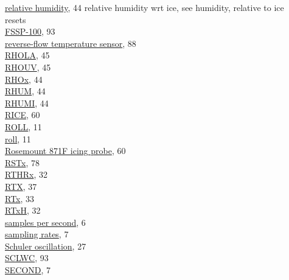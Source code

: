 \documentclass[
]{book}
\begin{document}
\href{./4-the-state-of-the-atmosphere.html\#rhumw}{relative humidity}, 44
relative humidity wrt ice, see humidity, relative to ice\\
resets\\
\hspace*{0.333em}\hspace*{0.333em}\href{./10-obsolete-variables.html\#freset}{FSSP-100}, 93\\
\href{./10-obsolete-variables.html\#ttrf}{reverse-flow temperature sensor}, 88\\
\href{./4-the-state-of-the-atmosphere.html\#rho}{RHOLA}, 45\\
\href{./4-the-state-of-the-atmosphere.html\#rho}{RHOUV}, 45\\
\href{./4-the-state-of-the-atmosphere.html\#rho}{RHOx}, 44\\
\href{./4-the-state-of-the-atmosphere.html\#rhumw}{RHUM}, 44\\
\href{./4-the-state-of-the-atmosphere.html\#rhumi}{RHUMI}, 44\\
\href{./5-cloud-physics-variables.html\#rice}{RICE}, 60\\
\href{./3-the-state-of-the-aircraft.html\#roll}{ROLL}, 11\\
\href{./3-the-state-of-the-aircraft.html\#roll}{roll}, 11\\
\href{./5-cloud-physics-variables.html\#rice}{Rosemount 871F icing probe}, 60\\
\href{./8-radiation-variables.html\#rstx}{RSTx}, 78\\
\href{./4-the-state-of-the-atmosphere.html\#recovery-t}{RTHRx}, 32\\
\href{./4-the-state-of-the-atmosphere.html\#recovery-t}{RTX}, 37\\
\href{./4-the-state-of-the-atmosphere.html\#recovery-t\%7C}{RTx}, 33\\
\href{./4-the-state-of-the-atmosphere.html\#recovery-t}{RTxH}, 32\\
\href{./2-general-information-about-data-files.html\#units-and-abbreviations}{samples per second}, 6\\
\href{./2-general-information-about-data-files.html\#synchronization-of-measurements}{sampling rates}, 7\\
\href{./3-the-state-of-the-aircraft.html\#inertial-reference-systems}{Schuler oscillation}, 27\\
\href{./10-obsolete-variables.html\#sclwc}{SCLWC}, 93\\
\href{./2-general-information-about-data-files.html\#hms\%7C}{SECOND}, 7\\
\end{document}
